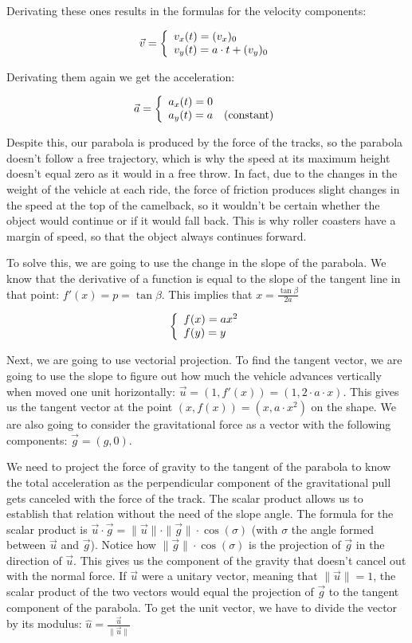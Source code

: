 \documentclass[12pt,twoside,a4paper]{article}
\newcommand{\ds}{\displaystyle}
\begin{document}
	Derivating these ones results in the formulas for the velocity components:
	
	$$\vec{v} = \left\{\begin{array}{l} v_x (t) = (v_x)_0 \cr v_y (t) = a \cdot t + (v_y)_0 \end{array}\right.$$
	
	Derivating them again we get the acceleration:
	
	$$\vec{a} = \left\{\begin{array}{l} a_x (t) = 0 \cr a_y (t) = a \quad (\text{constant}) \end{array}\right.$$
	
	Despite this, our parabola is produced by the force of the tracks, so the parabola doesn't follow a free trajectory, which is why the speed at its maximum height doesn't equal zero as it would in a free throw. In fact, due to the changes in the weight of the vehicle at each ride, the force of friction produces slight changes in the speed at the top of the camelback, so it wouldn't be certain whether the object would continue or if it would fall back. This is why roller coasters have a margin of speed, so that the object always continues forward.
	
	To solve this, we are going to use the change in the slope of the parabola. We know that the derivative of a function is equal to the slope of the tangent line in that point: $\ds f'(x) = p = \tan \beta$. This implies that $\ds x = \frac{\tan \beta}{2a}$
	
	$$\left\{\begin{array}{l} f(x) = ax^2 \cr f(y) = y \end{array}\right.$$
	
	Next, we are going to use vectorial projection. To find the tangent vector, we are going to use the slope to figure out how much the vehicle advances vertically when moved one unit horizontally: $\vec{u} = \left(1, f'(x)\right) = \left(1, 2 \cdot a \cdot x\right)$. This gives us the tangent vector at the point $\left(x, f(x)\right) = \left(x, a \cdot x^2\right)$ on the shape. We are also going to consider the gravitational force as a vector with the following components: $\vec{g} = \left(g, 0\right)$.
	
	We need to project the force of gravity to the tangent of the parabola to know the total acceleration as the perpendicular component of the gravitational pull gets canceled with the force of the track. The scalar product allows us to establish that relation without the need of the slope angle. The formula for the scalar product is $\vec{u} \cdot \vec{g} = \|\vec{u}\| \cdot \|\vec{g}\| \cdot \cos(\sigma)$ (with $\sigma$ the angle formed between $\vec{u}$ and $\vec{g}$). Notice how $\|\vec{g}\| \cdot \cos(\sigma)$ is the projection of $\vec{g}$ in the direction of $\vec{u}$. This gives us the component of the gravity that doesn't cancel out with the normal force. If $\vec{u}$ were a unitary vector, meaning that $\|\vec{u}\| = 1$, the scalar product of the two vectors would equal the projection of $\vec{g}$ to the tangent component of the parabola. To get the unit vector, we have to divide the vector by its modulus: $\ds \hat{u} = \frac{\vec{u}}{\|\vec{u}\|}$
	
\end{document}
